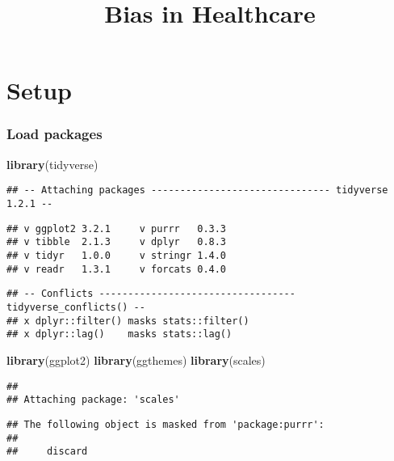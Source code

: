 \documentclass[]{article}
\title{Bias in Healthcare}
\author{}
\date{}
\newenvironment{Shaded}{\begin{snugshade}}{\end{snugshade}}
\newcommand{\KeywordTok}[1]{\textcolor[rgb]{0.13,0.29,0.53}{\textbf{#1}}}
\newcommand{\NormalTok}[1]{#1}
\begin{document}
\maketitle

\hypertarget{setup}{%
\section{Setup}\label{setup}}

\hypertarget{load-packages}{%
\subsubsection{Load packages}\label{load-packages}}

\begin{Shaded}
\begin{Highlighting}[]
\KeywordTok{library}\NormalTok{(tidyverse)}
\end{Highlighting}
\end{Shaded}

\begin{verbatim}
## -- Attaching packages ------------------------------- tidyverse 1.2.1 --
\end{verbatim}

\begin{verbatim}
## v ggplot2 3.2.1     v purrr   0.3.3
## v tibble  2.1.3     v dplyr   0.8.3
## v tidyr   1.0.0     v stringr 1.4.0
## v readr   1.3.1     v forcats 0.4.0
\end{verbatim}

\begin{verbatim}
## -- Conflicts ---------------------------------- tidyverse_conflicts() --
## x dplyr::filter() masks stats::filter()
## x dplyr::lag()    masks stats::lag()
\end{verbatim}

\begin{Shaded}
\begin{Highlighting}[]
\KeywordTok{library}\NormalTok{(ggplot2)}
\KeywordTok{library}\NormalTok{(ggthemes)}
\KeywordTok{library}\NormalTok{(scales)}
\end{Highlighting}
\end{Shaded}

\begin{verbatim}
## 
## Attaching package: 'scales'
\end{verbatim}

\begin{verbatim}
## The following object is masked from 'package:purrr':
## 
##     discard
\end{verbatim}
\end{document}
